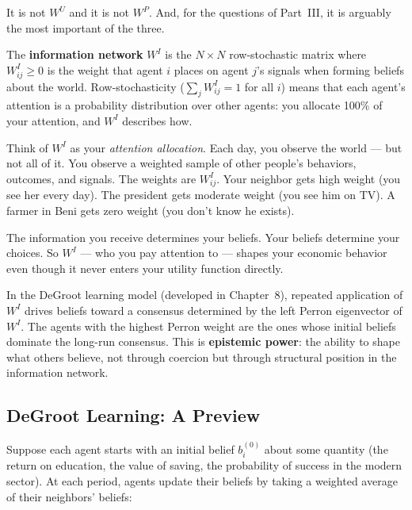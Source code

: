 \documentclass[../structural_economics_book.tex]{subfiles}
\begin{document}
It is not $W^U$ and it is not $W^P$. And, for the questions of Part~III, it is arguably the most important of the three.

\begin{definition}\label{ch05:def:WI}
The \textbf{information network} $W^I$ is the $N \times N$ row-stochastic matrix where $W^I_{ij} \geq 0$ is the weight that agent $i$ places on agent $j$'s signals when forming beliefs about the world. Row-stochasticity ($\sum_j W^I_{ij} = 1$ for all $i$) means that each agent's attention is a probability distribution over other agents: you allocate 100\% of your attention, and $W^I$ describes how.
\end{definition}

\begin{intuition}
Think of $W^I$ as your \textit{attention allocation}. Each day, you observe the world --- but not all of it. You observe a weighted sample of other people's behaviors, outcomes, and signals. The weights are $W^I_{ij}$. Your neighbor gets high weight (you see her every day). The president gets moderate weight (you see him on TV). A farmer in Beni gets zero weight (you don't know he exists).

The information you receive determines your beliefs. Your beliefs determine your choices. So $W^I$ --- who you pay attention to --- shapes your economic behavior even though it never enters your utility function directly.

In the DeGroot learning model (developed in Chapter~8), repeated application of $W^I$ drives beliefs toward a consensus determined by the left Perron eigenvector of $W^I$. The agents with the highest Perron weight are the ones whose initial beliefs dominate the long-run consensus. This is \textbf{epistemic power}: the ability to shape what others believe, not through coercion but through structural position in the information network.
\end{intuition}


\subsection{DeGroot Learning: A Preview}

Suppose each agent starts with an initial belief $b_i^{(0)}$ about some quantity (the return on education, the value of saving, the probability of success in the modern sector). At each period, agents update their beliefs by taking a weighted average of their neighbors' beliefs:
\end{document}
